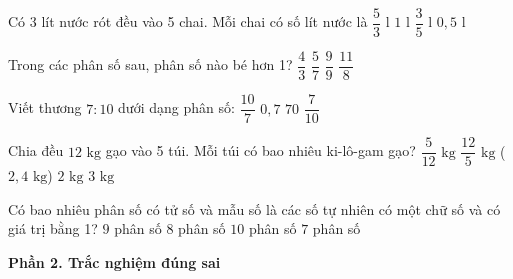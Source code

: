 \begin{ex} %
Có 3 lít nước rót đều vào 5 chai. Mỗi chai có số lít nước là
\choice
{$\dfrac{5}{3}\text{ l}$}
{$1\text{ l}$}
{\True $\dfrac{3}{5}\text{ l}$}
{$0{,}5\text{ l}$}
\end{ex}

\begin{ex} %
Trong các phân số sau, phân số nào bé hơn 1?
\choice
{$\dfrac{4}{3}$}
{\True $\dfrac{5}{7}$}
{$\dfrac{9}{9}$}
{$\dfrac{11}{8}$}
\end{ex}

\begin{ex} %
Viết thương $7 : 10$ dưới dạng phân số:
\choice
{$\dfrac{10}{7}$}
{$0{,}7$}
{$70$}
{\True $\dfrac{7}{10}$}
\end{ex}

\begin{ex} %
Chia đều $12\text{ kg}$ gạo vào 5 túi. Mỗi túi có bao nhiêu ki-lô-gam gạo?
\choice
{$\dfrac{5}{12}\text{ kg}$}
{\True $\dfrac{12}{5}\text{ kg}$ ($2{,}4\text{ kg}$)}
{$2\text{ kg}$}
{$3\text{ kg}$}
\end{ex}

\begin{ex} %
Có bao nhiêu phân số có tử số và mẫu số là các số tự nhiên có một chữ số và có giá trị bằng 1?
\choice
{\True $9$ phân số}
{$8$ phân số}
{$10$ phân số}
{$7$ phân số}
\end{ex}

\textbf{Phần 2. Trắc nghiệm đúng sai}

